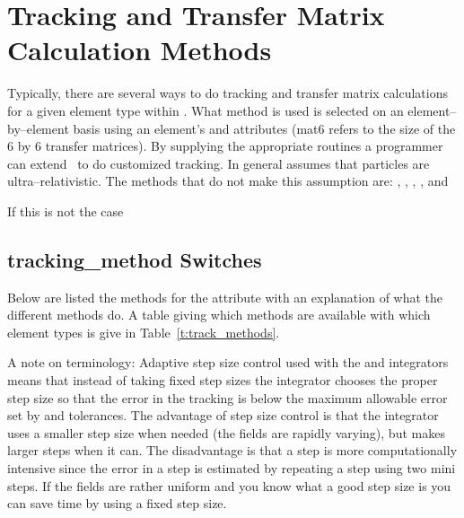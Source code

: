 \chapter{Tracking and Transfer Matrix Calculation Methods}

Typically, there are several ways to do tracking and transfer matrix
calculations for a given element type within \bmad. What method is
used is selected on an element--by--element basis using an element's
 and  attributes (mat6 refers
to the size of the 6 by 6 transfer matrices). By supplying the
appropriate routines a programmer can extend \bmad\ to do customized
tracking. In general \bmad assumes that particles are
ultra--relativistic. The methods that do not make this assumption are:
, , , , and 

If this is not the case 

\section{tracking\_method Switches}
\label{s:tkm}

Below are listed the methods for the 
attribute with an explanation of what the different methods do. A
table giving which methods are available with which element types is give
in Table~\ref{t:track_methods}. 

A note on terminology: Adaptive step size control used with the
 and  integrators means that 
instead of taking fixed step sizes the integrator chooses the proper
step size so that the error in the tracking is below the maximum
allowable error set by  and  tolerances. The
advantage of step size control is that the integrator uses a smaller
step size when needed (the fields are rapidly varying), but makes
larger steps when it can. The disadvantage is that a step is more
computationally intensive since the error in a step is estimated by
repeating a step using two mini steps. If the fields are rather
uniform and you know what a good step size is you can save time by using
a fixed step size.


